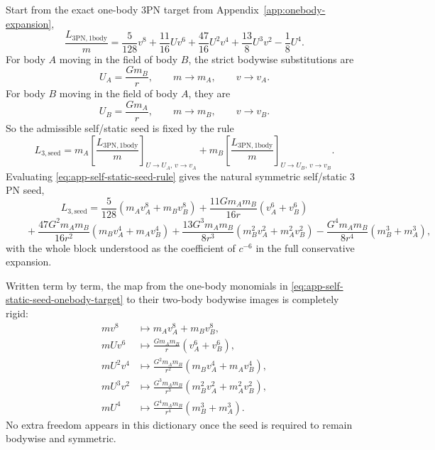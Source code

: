 \documentclass[11pt]{article}
\begin{document}
Start from the exact one-body $3$PN target from
Appendix~\ref{app:onebody-expansion},
\begin{equation}
\frac{L_{3\mathrm{PN},1\mathrm{body}}}{m}
=
\frac5{128}v^8
+\frac{11}{16}Uv^6
+\frac{47}{16}U^2v^4
+\frac{13}{8}U^3v^2
-\frac18U^4.
\label{eq:app-self-static-seed-onebody-target}
\end{equation}
For body $A$ moving in the field of body $B$, the strict bodywise substitutions
are
\begin{equation}
U_A=\frac{Gm_B}{r},
\qquad
m\to m_A,
\qquad
v\to v_A.
\label{eq:app-self-static-seed-bodyA}
\end{equation}
For body $B$ moving in the field of body $A$, they are
\begin{equation}
U_B=\frac{Gm_A}{r},
\qquad
m\to m_B,
\qquad
v\to v_B.
\label{eq:app-self-static-seed-bodyB}
\end{equation}
So the admissible self/static seed is fixed by the rule
\begin{equation}
L_{3,\mathrm{seed}}
=
m_A\left[\frac{L_{3\mathrm{PN},1\mathrm{body}}}{m}\right]_{U\to U_A,\,v\to v_A}
+
m_B\left[\frac{L_{3\mathrm{PN},1\mathrm{body}}}{m}\right]_{U\to U_B,\,v\to v_B}.
\label{eq:app-self-static-seed-rule}
\end{equation}
Evaluating \eqref{eq:app-self-static-seed-rule} gives the natural symmetric
self/static $3$PN seed,
\begin{equation}
\boxed{
L_{3,\mathrm{seed}}
=
\frac{5}{128}(m_Av_A^8+m_Bv_B^8)
+\frac{11Gm_A m_B}{16r}(v_A^6+v_B^6)
}
\label{eq:app-self-static-seed-first-line}
\end{equation}
\begin{equation}
\boxed{
\qquad
+\frac{47G^2m_A m_B}{16r^2}(m_Bv_A^4+m_Av_B^4)
+\frac{13G^3m_A m_B}{8r^3}(m_B^2v_A^2+m_A^2v_B^2)
-\frac{G^4m_A m_B}{8r^4}(m_B^3+m_A^3),
}
\label{eq:app-self-static-seed-second-line}
\end{equation}
with the whole block understood as the coefficient of $c^{-6}$ in the full
conservative expansion.

Written term by term, the map from the one-body monomials in
\eqref{eq:app-self-static-seed-onebody-target} to their two-body bodywise images
is completely rigid:
\begin{align}
mv^8
&\longmapsto m_Av_A^8+m_Bv_B^8,
\label{eq:app-self-static-seed-map-v8}
\\
mUv^6
&\longmapsto \frac{Gm_A m_B}{r}(v_A^6+v_B^6),
\label{eq:app-self-static-seed-map-uv6}
\\
mU^2v^4
&\longmapsto \frac{G^2m_A m_B}{r^2}(m_Bv_A^4+m_Av_B^4),
\label{eq:app-self-static-seed-map-u2v4}
\\
mU^3v^2
&\longmapsto \frac{G^3m_A m_B}{r^3}(m_B^2v_A^2+m_A^2v_B^2),
\label{eq:app-self-static-seed-map-u3v2}
\\
mU^4
&\longmapsto \frac{G^4m_A m_B}{r^4}(m_B^3+m_A^3).
\label{eq:app-self-static-seed-map-u4}
\end{align}
No extra freedom appears in this dictionary once the seed is required to remain
bodywise and symmetric.
\end{document}
